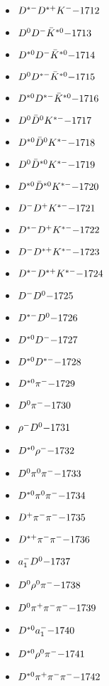 \begin{multicols}{3}
\begin{itemize}
 \item $ D^{*-} D^{*+} K^{-} \hfill{-1712}$
 \item $ D^{0} D^{-} \bar{K}^{*0} \hfill{-1713}$
 \item $ D^{*0} D^{-} \bar{K}^{*0} \hfill{-1714}$
 \item $ D^{0} D^{*-} \bar{K}^{*0} \hfill{-1715}$
 \item $ D^{*0} D^{*-} \bar{K}^{*0} \hfill{-1716}$
 \item $ D^{0} \bar{D}^{0} K^{*-} \hfill{-1717}$
 \item $ D^{*0} \bar{D}^{0} K^{*-} \hfill{-1718}$
 \item $ D^{0} \bar{D}^{*0} K^{*-} \hfill{-1719}$
 \item $ D^{*0} \bar{D}^{*0} K^{*-} \hfill{-1720}$
 \item $ D^{-} D^{+} K^{*-} \hfill{-1721}$
 \item $ D^{*-} D^{+} K^{*-} \hfill{-1722}$
 \item $ D^{-} D^{*+} K^{*-} \hfill{-1723}$
 \item $ D^{*-} D^{*+} K^{*-} \hfill{-1724}$
 \item $ D^{-} D^{0} \hfill{-1725}$
 \item $ D^{*-} D^{0} \hfill{-1726}$
 \item $ D^{*0} D^{-} \hfill{-1727}$
 \item $ D^{*0} D^{*-} \hfill{-1728}$
 \item $ D^{*0} \pi^{-} \hfill{-1729}$
 \item $ D^{0} \pi^{-} \hfill{-1730}$
 \item $ \rho^{-} D^{0} \hfill{-1731}$
 \item $ D^{*0} \rho^{-} \hfill{-1732}$
 \item $ D^{0} \pi^{0} \pi^{-} \hfill{-1733}$
 \item $ D^{*0} \pi^{0} \pi^{-} \hfill{-1734}$
 \item $ D^{+} \pi^{-} \pi^{-} \hfill{-1735}$
 \item $ D^{*+} \pi^{-} \pi^{-} \hfill{-1736}$
 \item $ a_{1}^{-} D^{0} \hfill{-1737}$
 \item $ D^{0} \rho^{0} \pi^{-} \hfill{-1738}$
 \item $ D^{0} \pi^{+} \pi^{-} \pi^{-} \hfill{-1739}$
 \item $ D^{*0} a_{1}^{-} \hfill{-1740}$
 \item $ D^{*0} \rho^{0} \pi^{-} \hfill{-1741}$
 \item $ D^{*0} \pi^{+} \pi^{-} \pi^{-} \hfill{-1742}$

\end{itemize}
\end{multicols}
